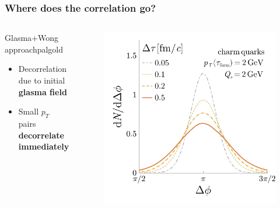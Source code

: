 \documentclass[aspectratio=169,11pt,usenames,dvipsnames]{beamer}
\begin{document}
\begin{frame}
    \frametitle{Where does the correlation go?}
    \vspace{-15pt}
    \begin{center}
        \begin{columns}[onlytextwidth,t]
           \begin{center}
                \begin{custombox2}{\normalsize Glasma+Wong approach}{palgold}
                    \small
                    \begin{varwidth}{0.93\textwidth}
                    \begin{itemize}\itemsep0em 
                        \itemsep0em
                        \footnotesize
                        \item Decorrelation due to initial {\bfseries\color{palgold}glasma field}
                        \item Small $p_T$ pairs {\bfseries\color{palgold}decorrelate immediately} 
                    \end{itemize}
                    \end{varwidth}
                \end{custombox2}
            \end{center}
            \vspace{-15pt}
           \begin{figure}
                \centering
                \includegraphics[width=0.7\columnwidth]{images/final_dNdphi_tau_dep_charm_v2.png}

\end{figure}
\end{columns}
\end{center}
\end{frame}
\end{document}
